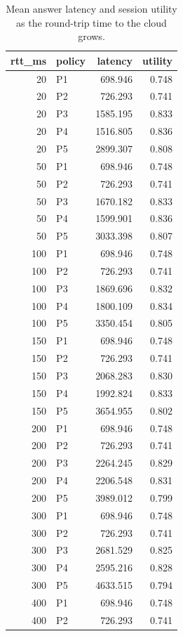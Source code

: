 \begin{table}[htbp]
\centering
\small
\caption{Mean answer latency and session utility as the round-trip time to the cloud grows.}
\label{tab:rtt_sweep}
\begin{tabular}{r l r r}
\toprule
rtt\_ms & policy & latency & utility \\
\midrule
20 & P1 & 698.946 & 0.748 \\
20 & P2 & 726.293 & 0.741 \\
20 & P3 & 1585.195 & 0.833 \\
20 & P4 & 1516.805 & 0.836 \\
20 & P5 & 2899.307 & 0.808 \\
50 & P1 & 698.946 & 0.748 \\
50 & P2 & 726.293 & 0.741 \\
50 & P3 & 1670.182 & 0.833 \\
50 & P4 & 1599.901 & 0.836 \\
50 & P5 & 3033.398 & 0.807 \\
100 & P1 & 698.946 & 0.748 \\
100 & P2 & 726.293 & 0.741 \\
100 & P3 & 1869.696 & 0.832 \\
100 & P4 & 1800.109 & 0.834 \\
100 & P5 & 3350.454 & 0.805 \\
150 & P1 & 698.946 & 0.748 \\
150 & P2 & 726.293 & 0.741 \\
150 & P3 & 2068.283 & 0.830 \\
150 & P4 & 1992.824 & 0.833 \\
150 & P5 & 3654.955 & 0.802 \\
200 & P1 & 698.946 & 0.748 \\
200 & P2 & 726.293 & 0.741 \\
200 & P3 & 2264.245 & 0.829 \\
200 & P4 & 2206.548 & 0.831 \\
200 & P5 & 3989.012 & 0.799 \\
300 & P1 & 698.946 & 0.748 \\
300 & P2 & 726.293 & 0.741 \\
300 & P3 & 2681.529 & 0.825 \\
300 & P4 & 2595.216 & 0.828 \\
300 & P5 & 4633.515 & 0.794 \\
400 & P1 & 698.946 & 0.748 \\
400 & P2 & 726.293 & 0.741 \\

\end{tabular}
\end{table}
